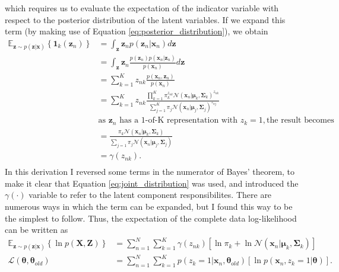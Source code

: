 \documentclass{article}
\begin{document}
which requires us to evaluate the expectation of the indicator variable with respect to the posterior distribution of the latent variables. If we expand this term (by making use of Equation \eqref{eq:posterior_distribution}), we obtain
\begin{equation}
\begin{aligned}
\mathbb{E}_{\mathbf{z} \sim p(\mathbf{z}\vert\mathbf{x})} \left\lbrace \mathbf{1}_k(\mathbf{z}_n) \right\rbrace &= \int_{\mathbf{z}} \mathbf{z}_n p(\mathbf{z}_n\vert\mathbf{x}_n)d\mathbf{z} \\
&= \int_{\mathbf{z}} \mathbf{z}_n \frac{p(\mathbf{z}_n)p(\mathbf{x}_n\vert \mathbf{z}_n)}{p(\mathbf{x}_n)} d\mathbf{z} \\
&= \sum_{k=1}^K z_{nk} \frac{p(\mathbf{x}_n, \mathbf{z}_n)}{p(\mathbf{x}_n)} \\
&=  \sum_{k=1}^K z_{nk} \frac{\prod_{k=1}^{K} \pi_k^{z_{nk}} \mathcal{N}(\mathbf{x}_n\vert \boldsymbol\mu_k, \boldsymbol\Sigma_k)^{z_{nk}}}{\sum_{j=1}^{K} \pi_j \mathcal{N}(\mathbf{x}_n \vert \boldsymbol\mu_j, \boldsymbol\Sigma_j)^{z_{nj}}} \\
& \text{as } \mathbf{z}_n \text{ has a 1-of-K representation with } z_{k} = 1, \text {the result becomes}  \\
&= \frac{\pi_k\mathcal{N}(\mathbf{x}_n\vert \boldsymbol\mu_k, \boldsymbol\Sigma_k)}{\sum_{j=1}\pi_j\mathcal{N}(\mathbf{x}_n\vert \boldsymbol\mu_j, \boldsymbol\Sigma_j)} \\
&= \gamma(z_{nk}). \\
\end{aligned}
\end{equation}
In this derivation I reversed some terms in the numerator of Bayes' theorem, to make it clear that Equation \eqref{eq:joint_distribution} was used, and introduced the $\gamma(\cdot)$ variable to refer to the latent component responsibilites. There are numerous ways in which the term can be expanded, but I found this way to be the simplest to follow. Thus, the expectation of the complete data log-likelihood can be written as
\begin{equation}\label{eq:final_complete_data_log_likelihood}
\begin{aligned}
\mathbb{E}_{\mathbf{z} \sim p(\mathbf{z}\vert\mathbf{x})} \left\lbrace \ln p(\mathbf{X}, \mathbf{Z}) \right\rbrace &=  \sum_{n=1}^{N} \sum_{k=1}^{K}  \gamma(z_{nk}) \left[ \ln \pi_k + \ln \mathcal{N}(\mathbf{x}_n \vert \boldsymbol\mu_k, \boldsymbol\Sigma_k) \right] \\
\mathcal{L}(\boldsymbol\theta, \boldsymbol\theta_{old}) &= \sum_{n=1}^{N} \sum_{k=1}^{K} p(z_k = 1\vert \mathbf{x}_n, \boldsymbol\theta_{old}) \left[ \ln p(\mathbf{x}_n, z_k = 1 \vert \boldsymbol\theta) \right].
\end{aligned}
\end{equation}
\end{document}
